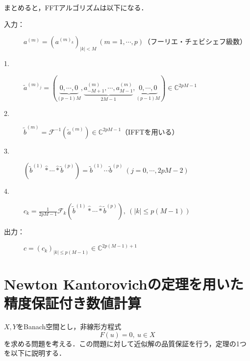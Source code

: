 \documentclass[11pt,a4paper,titlepage]{jsreport}
\theoremstyle{definition}
\begin{document}
まとめると，FFTアルゴリズムは以下になる．
\begin{screen}
  \begin{description}
    \item[入力：]$a^{(m)}=\left( a^{(m)_k} \right)_{|k|<M}\ (m=1,\cdots,p)$（フーリエ・チェビシェフ級数）
    \item[1.] $\tilde{a}^{(m)_j} = \left( \underbrace{0,\cdots,0}_{(p-1)M}, \underbrace{a_{-M+1}^{(m)},\cdots,a_{M-1}^{(m)}}_{2M-1},\underbrace{{0,\cdots,0}}_{(p-1)M}\right) \in \mathbb{C}^{2pM-1}$
    \item[2.] $\tilde{b}^{(m)}=\mathcal{F}^{-1} (\tilde{a}^{(m)}) \in \mathbb{C}^{2pM-1}$（IFFTを用いる）
    \item[3.] $\left( \tilde{b}^{(1)} \hat* \cdots \hat* \tilde{b}^{(p)} \right) = \tilde{b}^{(1)} \cdots \tilde{b}^{(p)}\ \left(j=0,\cdots,2pM-2\right)$
    \item[4.] $c_k = \frac{1}{2pM-1} \mathcal{F}_k \left( \tilde{b}^{(1)} \hat* \cdots \hat* \tilde{b}^{(p)} \right),\ (|k| \leq p(M-1))$
    \item[出力：] $c=\left( c_k \right)_{|k|\leq p(M-1)} \in \mathbb{C}^{2p(M-1)+1}$
  \end{description}
\end{screen}

\newpage
\chapter{Newton Kantorovichの定理を用いた精度保証付き数値計算}
$X,Y$をBanach空間とし，非線形方程式
\begin{equation*}
  F(u)=0,\ u\in X
\end{equation*}
を求める問題を考える．この問題に対して近似解の品質保証を行う，定理の1つを以下に説明する．
\end{document}
